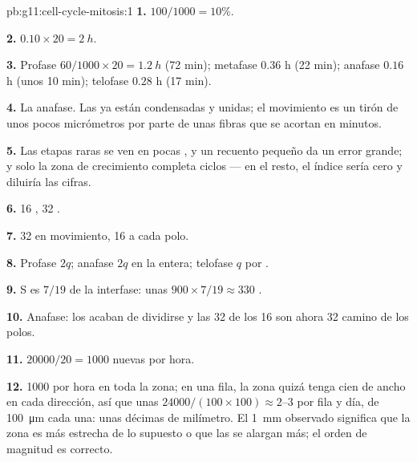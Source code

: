 \begin{solution}{pb:g11:cell-cycle-mitosis:1}
\textbf{1.} $100/1000 = 10\%$.

\textbf{2.} $0.10 \times 20 = \qty{2}{h}$.

\textbf{3.} Profase $60/1000 \times 20 = \qty{1.2}{h}$ (72 min);
metafase $0.36$ h (22 min); anafase $0.16$ h (unos 10 min); telofase
$0.28$ h (17 min).

\textbf{4.} La anafase. Las  ya están condensadas y unidas;
el movimiento es un tirón de unos pocos micrómetros por parte de unas
fibras que se acortan en minutos.

\textbf{5.} Las etapas raras se ven en pocas , y un recuento
pequeño da un error grande; y solo la zona de crecimiento completa
ciclos --- en el resto, el índice sería cero y diluiría las cifras.

\textbf{6.} 16 , 32 .

\textbf{7.} 32  en movimiento, 16 a cada polo.

\textbf{8.} Profase $2q$; anafase $2q$ en la  entera; telofase
$q$ por .

\textbf{9.} S es $7/19$ de la interfase: unas $900 \times 7/19 \approx
330$ .

\textbf{10.} Anafase: los  acaban de dividirse y las 32
 de los 16  son ahora 32  camino de los
polos.

\textbf{11.} $\num{20000}/20 = 1000$  nuevas por hora.

\textbf{12.} 1000  por hora en toda la zona; en una fila, la
zona quizá tenga cien  de ancho en cada dirección, así que unas
$\num{24000}/(100 \times 100) \approx 2$--3  por fila y día, de
\qty{100}{\micro m} cada una: unas décimas de milímetro. El
\qty{1}{mm} observado significa que la zona es más estrecha de lo
supuesto o que las  se alargan más; el orden de magnitud es
correcto.


\end{solution}
